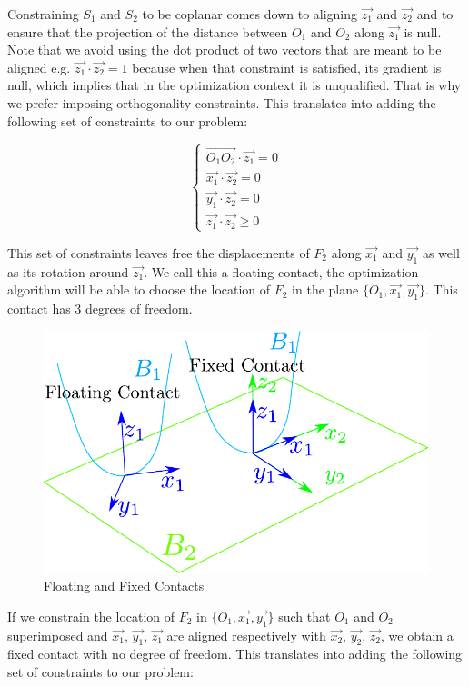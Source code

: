 Constraining $S_1$ and $S_2$ to be coplanar comes down to aligning $\vec{z_1}$ and $\vec{z_2}$ and to ensure that the projection of the distance between $O_1$ and $O_2$ along $\vec{z_1}$ is null.
Note that we avoid using the dot product of two vectors that are meant to be aligned e.g. $\vec{z_1}\cdot\vec{z_2} = 1$ because when that constraint is satisfied, its gradient is null, which implies that in the optimization context it is unqualified.
That is why we prefer imposing orthogonality constraints.
This translates into adding the following set of constraints to our problem:

\begin{equation}
\label{eq:coplanarity}
\boxed{\left\{
  \begin{array}{l}
    \overrightarrow{O_1O_2} \cdot \vec{z_1} = 0\\
    \vec{x_1}\cdot\vec{z_2} = 0\\
    \vec{y_1}\cdot\vec{z_2} = 0\\
    \vec{z_1}\cdot\vec{z_2} \geq 0
  \end{array}
  \right.}
\end{equation}

This set of constraints leaves free the displacements of $F_2$ along $\vec{x_1}$ and $\vec{y_1}$ as well as its rotation around $\vec{z_1}$.
We call this a floating contact, the optimization algorithm will be able to choose the location of $F_2$ in the plane $\{O_1, \vec{x_1}, \vec{y_1}\}$. This contact has 3 degrees of freedom.

\begin{figure}[htpb]
  \centering
  \includegraphics[width=0.8\linewidth]{contactConstraint.pdf}
  \caption{Floating and Fixed Contacts}
\label{fig:contactConstraint}
\end{figure}

If we constrain the location of $F_2$ in $\{O_1, \vec{x_1}, \vec{y_1}\}$ such that $O_1$ and $O_2$ superimposed and $\vec{x_1}$, $\vec{y_1}$, $\vec{z_1}$ are aligned respectively with $\vec{x_2}$, $\vec{y_2}$, $\vec{z_2}$, we obtain a fixed contact with no degree of freedom. This translates into adding the following set of constraints to our problem:

